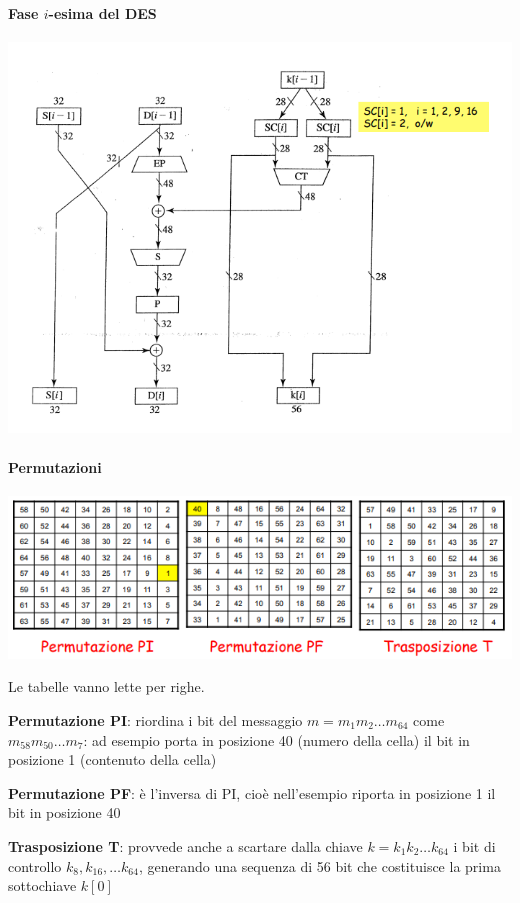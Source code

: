 \documentclass[10pt]{book}
\begin{document}
\paragraph{Fase $i$-esima del DES}
\begin{center}
	\includegraphics[scale=0.75]{9.png}
\end{center}
\paragraph{Permutazioni}
\begin{center}
	\includegraphics[scale=0.75]{10.png}
\end{center}
Le tabelle vanno lette per righe.
\begin{list}{}{}
	\item \textbf{Permutazione PI}: riordina i bit del messaggio $m = m_1 m_2\ldots m_{64}$ come $m_{58} m_{50}\ldots m_7$: ad esempio porta in posizione 40 (numero della cella) il bit in posizione 1 (contenuto della cella)
	\item \textbf{Permutazione PF}: è l'inversa di PI, cioè nell'esempio riporta in posizione 1 il bit in posizione 40
	\item \textbf{Trasposizione T}: provvede anche a scartare dalla chiave $k = k_1 k_2\ldots k_{64}$ i bit di controllo $k_8, k_{16}, \ldots k_{64}$, generando una sequenza di 56 bit che costituisce la prima sottochiave $k[0]$
\end{list}
\pagebreak
\end{document}
